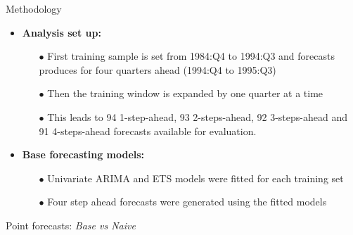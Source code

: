 \documentclass[11pt,xcolor=dvipsnames,handout]{beamer} %
\begin{document}
\begin{frame}{Methodology}
\begin{itemize}[<+-| alert@+>]
	\item \textbf{Analysis set up:}
	\begin{itemize}[<+-| alert@+>]
		\item[$\bullet$] First training sample is set from 1984:Q4 to 1994:Q3 and forecasts produces for four quarters ahead (1994:Q4 to 1995:Q3)
		\item[$\bullet$] Then the training window is expanded by one quarter at a time
		\item[$\bullet$] This leads to 94 1-step-ahead, 93 2-steps-ahead, 92 3-steps-ahead and 91 4-steps-ahead forecasts available for evaluation. 
	\end{itemize}
	\item[]
	\item \textbf{Base forecasting models:}
	\begin{itemize}[<+-| alert@+>]
		\item[$\bullet$] Univariate ARIMA and ETS models were fitted for each training set \item[$\bullet$] Four step ahead forecasts were generated using the fitted models
	\end{itemize}
	
\end{itemize}
\end{frame}


\begin{frame}{Point forecasts: \textit{Base vs Naive}}
\begin{itemize}[<+-| alert@+>]
	\item[] 
	
	
\end{itemize}
\end{frame}
\end{document}
